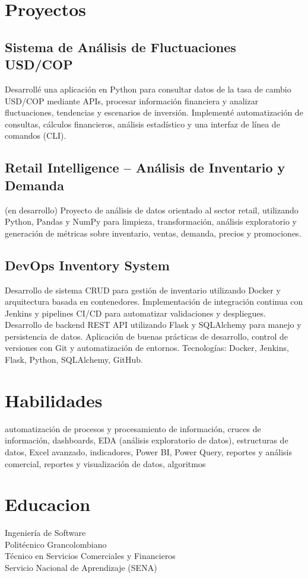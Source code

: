 \documentclass[10pt,a4paper]{article}
\begin{document}
\section*{Proyectos}
\subsection*{Sistema de Análisis de Fluctuaciones USD/COP}
Desarrollé una aplicación en Python para consultar datos de la tasa de cambio USD/COP mediante APIs, procesar información financiera y analizar fluctuaciones, tendencias y escenarios de inversión. Implementé automatización de consultas, cálculos financieros, análisis estadístico y una interfaz de línea de comandos (CLI).

\subsection*{Retail Intelligence -- Análisis de Inventario y Demanda}
(en desarrollo) Proyecto de análisis de datos orientado al sector retail, utilizando Python, Pandas y NumPy para limpieza, transformación, análisis exploratorio y generación de métricas sobre inventario, ventas, demanda, precios y promociones.

\subsection*{DevOps Inventory System}
Desarrollo de sistema CRUD para gestión de inventario utilizando Docker y arquitectura basada en contenedores. Implementación de integración continua con Jenkins y pipelines CI/CD para automatizar validaciones y despliegues. Desarrollo de backend REST API utilizando Flask y SQLAlchemy para manejo y persistencia de datos. Aplicación de buenas prácticas de desarrollo, control de versiones con Git y automatización de entornos. Tecnologías: Docker, Jenkins, Flask, Python, SQLAlchemy, GitHub.


\section*{Habilidades}
automatización de procesos y procesamiento de información, cruces de información, dashboards, EDA (análisis exploratorio de datos), estructuras de datos, Excel avanzado, indicadores, Power BI, Power Query, reportes y análisis comercial, reportes y visualización de datos, algoritmos


\section*{Educacion}
Ingeniería de Software\\

Politécnico Grancolombiano\\

Técnico en Servicios Comerciales y Financieros\\

Servicio Nacional de Aprendizaje (SENA)\\
\end{document}
